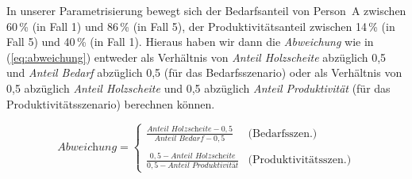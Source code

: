 \documentclass[justified,nobib,nohyper,symmetric,twoside]{tufte-book}
\begin{document}
In unserer Parametrisierung bewegt sich der Bedarfsanteil von Person~A zwischen 60\,\% (in Fall 1) und 86\,\% (in Fall 5), der Produktivitätsanteil zwischen 14\,\% (in Fall 5) und 40\,\% (in Fall 1).
Hieraus haben wir dann die \textit{Abweichung} wie in (\ref{eq:abweichung}) entweder als Verhältnis von \textit{\mbox{Anteil} Holzscheite} abzüglich 0,5 und \textit{Anteil Bedarf} abzüglich 0,5 (für das Bedarfsszenario) oder als Verhältnis von 0,5 abzüglich \textit{Anteil Holzscheite} und 0,5 abzüglich \textit{Anteil Produktivität} (für das Produktivitätsszenario) berechnen können.

\begin{equation}\label{eq:abweichung}
   \textit{Abweichung} = \left\{\begin{array}{ll}\frac{\textit{Anteil Holzscheite}-0,5}{\textit{Anteil Bedarf}-0,5} & \textrm{(Bedarfsszen.)}\\ \\
   \frac{0,5-\textit{Anteil Holzscheite}}{0,5-\textit{Anteil Produktivität}} & \textrm{(Produktivitätsszen.)}
   \end{array}
   \right.
\end{equation}
\end{document}
